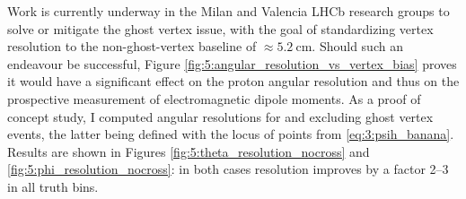 Work is currently underway in the Milan and Valencia LHCb research groups to solve or mitigate the ghost vertex issue, with the goal of standardizing \lz vertex resolution to the non-ghost-vertex baseline of $\approx \SI{5.2}{\centi\meter}$.
Should such an endeavour be successful, Figure \ref{fig:5:angular_resolution_vs_vertex_bias} proves it would have a significant effect on the proton angular resolution and thus on the prospective measurement of \lz electromagnetic dipole moments.
As a proof of concept study, I computed angular resolutions for \cthetap and \phip excluding ghost vertex events, the latter being defined with the locus of points from \eqref{eq:3:psih_banana}.
Results are shown in Figures \ref{fig:5:theta_resolution_nocross} and \ref{fig:5:phi_resolution_nocross}:
in both cases resolution improves by a factor 2--3 in all truth bins.